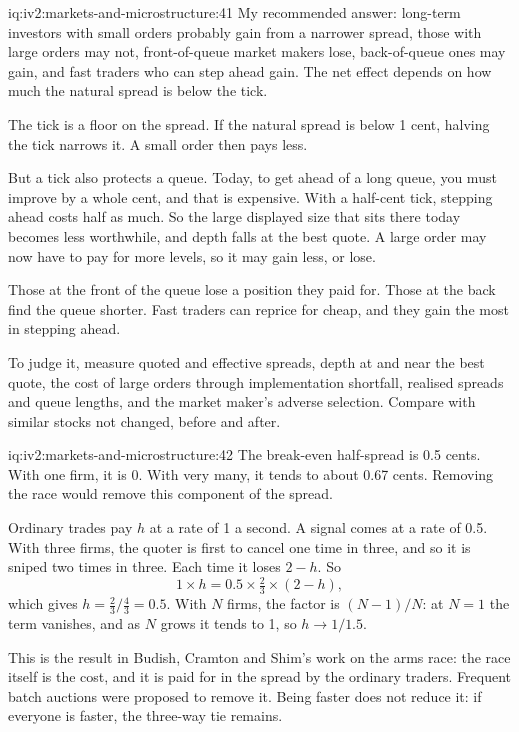 \begin{solution}{iq:iv2:markets-and-microstructure:41}
My recommended answer: long-term investors with small orders probably gain from a narrower spread, those with large orders may not, front-of-queue market makers lose, back-of-queue ones may gain, and fast traders who can step ahead gain. The net effect depends on how much the natural spread is below the tick.

The tick is a floor on the spread. If the natural spread is below 1 cent, halving the tick narrows it. A small order then pays less.

But a tick also protects a queue. Today, to get ahead of a long queue, you must improve by a whole cent, and that is expensive. With a half-cent tick, stepping ahead costs half as much. So the large displayed size that sits there today becomes less worthwhile, and depth falls at the best quote. A large order may now have to pay for more levels, so it may gain less, or lose.

Those at the front of the queue lose a position they paid for. Those at the back find the queue shorter. Fast traders can reprice for cheap, and they gain the most in stepping ahead.

To judge it, measure quoted and effective spreads, depth at and near the best quote, the cost of large orders through implementation shortfall, realised spreads and queue lengths, and the market maker's adverse selection. Compare with similar stocks not changed, before and after.

\end{solution}

\begin{solution}{iq:iv2:markets-and-microstructure:42}
The break-even half-spread is 0.5 cents. With one firm, it is 0. With very many, it tends to about 0.67 cents. Removing the race would remove this component of the spread.

Ordinary trades pay $h$ at a rate of 1 a second. A signal comes at a rate of 0.5. With three firms, the quoter is first to cancel one time in three, and so it is sniped two times in three. Each time it loses $2 - h$. So
\[
1 \times h = 0.5 \times \tfrac23 \times (2 - h),
\]
which gives $h = \tfrac23/\tfrac43 = 0.5$. With $N$ firms, the factor is $(N - 1)/N$: at $N = 1$ the term vanishes, and as $N$ grows it tends to 1, so $h \to 1/1.5$.

This is the result in Budish, Cramton and Shim's work on the arms race: the race itself is the cost, and it is paid for in the spread by the ordinary traders. Frequent batch auctions were proposed to remove it. Being faster does not reduce it: if everyone is faster, the three-way tie remains.

\end{solution}

